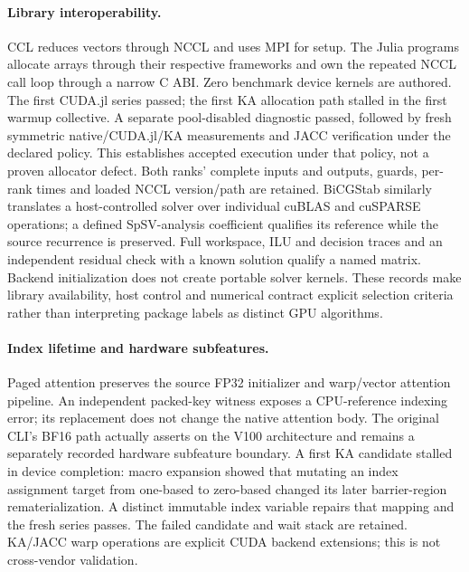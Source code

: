 \paragraph{Library interoperability.}
CCL reduces vectors through NCCL and uses MPI for setup. The Julia programs allocate arrays through their respective frameworks and own the repeated NCCL call loop through a narrow C ABI. Zero benchmark device kernels are authored. The first CUDA.jl series passed; the first KA allocation path stalled in the first warmup collective. A separate pool-disabled diagnostic passed, followed by fresh symmetric native/CUDA.jl/KA measurements and JACC verification under the declared policy. This establishes accepted execution under that policy, not a proven allocator defect. Both ranks' complete inputs and outputs, guards, per-rank times and loaded NCCL version/path are retained. BiCGStab similarly translates a host-controlled solver over individual cuBLAS and cuSPARSE operations; a defined SpSV-analysis coefficient qualifies its reference while the source recurrence is preserved. Full workspace, ILU and decision traces and an independent residual check with a known solution qualify a named matrix. Backend initialization does not create portable solver kernels. These records make library availability, host control and numerical contract explicit selection criteria rather than interpreting package labels as distinct GPU algorithms.

\paragraph{Index lifetime and hardware subfeatures.}
Paged attention preserves the source FP32 initializer and warp/vector attention pipeline. An independent packed-key witness exposes a CPU-reference indexing error; its replacement does not change the native attention body. The original CLI's BF16 path actually asserts on the V100 architecture and remains a separately recorded hardware subfeature boundary. A first KA candidate stalled in device completion: macro expansion showed that mutating an index assignment target from one-based to zero-based changed its later barrier-region rematerialization. A distinct immutable index variable repairs that mapping and the fresh series passes. The failed candidate and wait stack are retained. KA/JACC warp operations are explicit CUDA backend extensions; this is not cross-vendor validation.

